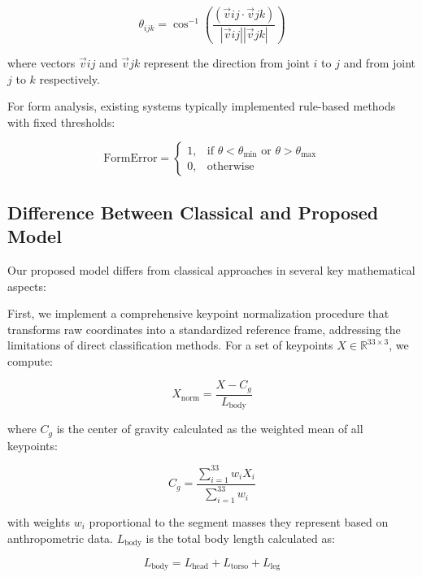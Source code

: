 \documentclass[11pt]{article}
\begin{document}
\begin{equation}
\theta_{ijk} = \cos^{-1}\left(\frac{(\vec{v}{ij} \cdot \vec{v}{jk})}{|\vec{v}{ij}||\vec{v}{jk}|}\right)
\end{equation}

where vectors $\vec{v}{ij}$ and $\vec{v}{jk}$ represent the direction from joint $i$ to $j$ and from joint $j$ to $k$ respectively.

For form analysis, existing systems typically implemented rule-based methods with fixed thresholds:

\begin{equation}
\text{FormError} = 
\begin{cases}
1, & \text{if } \theta < \theta_{\text{min}} \text{ or } \theta > \theta_{\text{max}} \\
0, & \text{otherwise}
\end{cases}
\end{equation}

\subsection{Difference Between Classical and Proposed Model}
Our proposed model differs from classical approaches in several key mathematical aspects:

First, we implement a comprehensive keypoint normalization procedure that transforms raw coordinates into a standardized reference frame, addressing the limitations of direct classification methods. For a set of keypoints $X \in \mathbb{R}^{33 \times 3}$, we compute:

\begin{equation}
X_{\text{norm}} = \frac{X - C_g}{L_{\text{body}}}
\end{equation}

where $C_g$ is the center of gravity calculated as the weighted mean of all keypoints:

\begin{equation}
C_g = \frac{\sum_{i=1}^{33} w_i X_i}{\sum_{i=1}^{33} w_i}
\end{equation}

with weights $w_i$ proportional to the segment masses they represent based on anthropometric data. $L_{\text{body}}$ is the total body length calculated as:

\begin{equation}
L_{\text{body}} = L_{\text{head}} + L_{\text{torso}} + L_{\text{leg}}
\end{equation}
\end{document}
